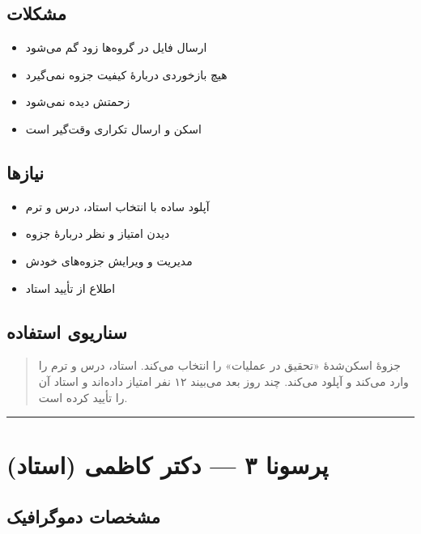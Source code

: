 \documentclass[12pt, a4paper]{article}
\begin{document}
\subsection{مشکلات}

\begin{itemize}
\tightlist
\item
  ارسال فایل در گروه‌ها زود گم می‌شود
\item
  هیچ بازخوردی دربارهٔ کیفیت جزوه نمی‌گیرد
\item
  زحمتش دیده نمی‌شود
\item
  اسکن و ارسال تکراری وقت‌گیر است
\end{itemize}

\subsection{نیازها}

\begin{itemize}
\tightlist
\item
  آپلود ساده با انتخاب استاد، درس و ترم
\item
  دیدن امتیاز و نظر دربارهٔ جزوه
\item
  مدیریت و ویرایش جزوه‌های خودش
\item
  اطلاع از تأیید استاد
\end{itemize}

\subsection{سناریوی استفاده}

\begin{quote}
جزوهٔ اسکن‌شدهٔ «تحقیق در عملیات» را انتخاب می‌کند. استاد، درس و ترم را
وارد می‌کند و آپلود می‌کند. چند روز بعد می‌بیند ۱۲ نفر امتیاز داده‌اند
و استاد آن را تأیید کرده است.
\end{quote}

\begin{center}\rule{0.5\linewidth}{0.5pt}\end{center}

\section{پرسونا ۳ — دکتر کاظمی (استاد)}

\subsection{مشخصات دموگرافیک}
\end{document}
